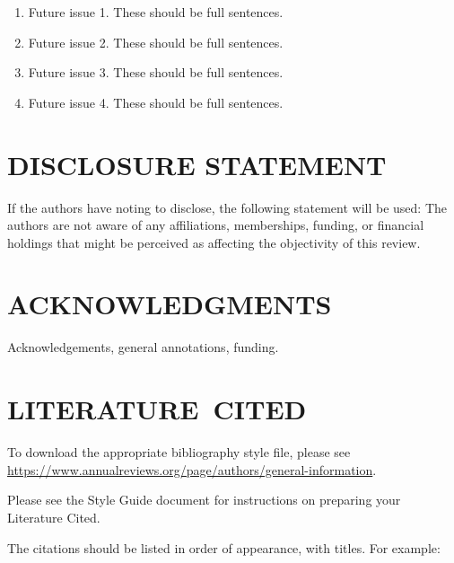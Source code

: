 \documentclass{ar-1col-S2O}
\begin{document}
\begin{issues}
\begin{enumerate}
\item Future issue 1. These should be full sentences.
\item Future issue 2. These should be full sentences.
\item Future issue 3. These should be full sentences.
\item Future issue 4. These should be full sentences.
\end{enumerate}
\end{issues}

\section*{DISCLOSURE STATEMENT}
If the authors have noting to disclose, the following statement will be used: The authors are not aware of any affiliations, memberships, funding, or financial holdings that
might be perceived as affecting the objectivity of this review. 

\section*{ACKNOWLEDGMENTS}
Acknowledgements, general annotations, funding.

%
\section*{LITERATURE\ CITED}

To download the appropriate bibliography style file, please see \url{https://www.annualreviews.org/page/authors/general-information}. 

\noindent
Please see the Style Guide document for instructions on preparing your Literature Cited.

The citations should be listed in order of appearance, with titles. For example:



\end{document}
